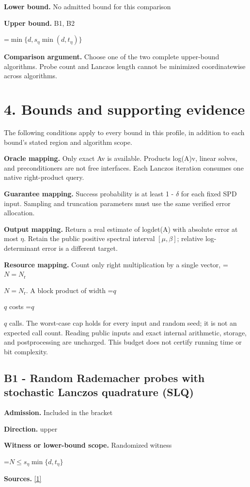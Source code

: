 \documentclass[10pt,a4paper]{article}
\newcommand{\AtlasMath}[1]{\par\begingroup\centering\setbox0=\hbox{$\displaystyle #1$}\ifdim\wd0>1.4\linewidth\typeout{ATLAS WIDE FORMULA: \the\wd0}\fi\ifdim\wd0>\linewidth\resizebox{\linewidth}{!}{\box0}\else\box0\fi\par\endgroup}
\newcommand{\AtlasInlineMath}[1]{\begingroup\setbox0=\hbox{$#1$}\ifdim\wd0>.4\linewidth\endgroup\AtlasMath{#1}\else\endgroup$#1$\fi}
\begin{document}
\textbf{Lower bound.} No admitted bound for this comparison

\textbf{Upper bound.} B1, B2

\AtlasMath{\min\{d,s_\eta\min(d,t_\eta)\}}
\textbf{Comparison argument.} Choose one of the two complete upper-bound algorithms. Probe count and Lanczos length cannot be minimized coordinatewise across algorithms.

\section{4. Bounds and supporting evidence}
The following conditions apply to every bound in this profile, in addition to each bound's stated region and algorithm scope.

\textbf{Oracle mapping.} Only exact Av is available. Products log(A)v, linear solves, and preconditioners are not free interfaces. Each Lanczos iteration consumes one native right-product query.

\textbf{Guarantee mapping.} Success probability is at least 1 - $\delta$ for each fixed SPD input. Sampling and truncation parameters must use the same verified error allocation.

\textbf{Output mapping.} Return a real estimate of logdet(A) with absolute error at most $\eta$. Retain the public positive spectral interval $[\mu ,\beta ]$; relative log-determinant error is a different target.

\textbf{Resource mapping.} Count only right multiplication by a single vector, \AtlasInlineMath{N=N_{\mathrm r}}. A block product of width \AtlasInlineMath{q} costs \AtlasInlineMath{q} calls. The worst-case cap holds for every input and random seed; it is not an expected call count. Reading public inputs and exact internal arithmetic, storage, and postprocessing are uncharged. This budget does not certify running time or bit complexity.

\subsection{B1 - Random Rademacher probes with stochastic Lanczos quadrature (SLQ)}
\textbf{Admission.} Included in the bracket

\textbf{Direction.} upper

\textbf{Witness or lower-bound scope.} Randomized witness

\AtlasMath{N\le s_\eta\min\{d,t_\eta\}}
\textbf{Sources.} \href{https://arxiv.org/pdf/2005.10009v2}{[1]}
\end{document}
